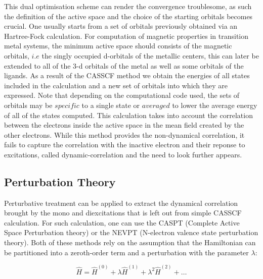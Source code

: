 \documentclass[10pt]{report}
\numberwithin{equation}{section}
\begin{document}
This dual optimisation scheme can render the convergence troublesome, as such the definition of the active space and the choice of the starting orbitals becomes crucial. One usually starts from a set of orbitals previously obtained via an Hartree-Fock calculation.
For computation of magnetic properties in transition metal systems, the minimum active space should consists of the magnetic orbitals, $i.e$ the singly occupied d-orbitals of the metallic centers, this can later be extended to all of the 3-d orbitals of the metal as well as some orbitals of the ligands.
As a result of the CASSCF method we obtain the energies of all states included in the calculation and a new set of orbitals into which they are expressed.
Note that depending on the computational code used, the sets of orbitals may be $specific$ to a single state or $averaged$ to lower the average energy of all of the states computed.
This calculation takes into account the correlation between the electrons inside the active space in the mean field created by the other electrons. 
While this method provides the non-dynamical correlation, it fails to capture the correlation with the inactive electron and their reponse to excitations, called dynamic-correlation and the need to look further appears.


\subsection{Perturbation Theory}

Perturbative treatment can be applied to extract the dynamical correlation brought by the mono and diexcitations that is left out from simple CASSCF calculation. For such calculation, one can use the CASPT (Complete Active Space Perturbation theory)
or the NEVPT (N-electron valence state perturbation theory). Both of these methods rely on the assumption that the Hamiltonian can be partitioned into a zeroth-order term and a perturbation with the parameter $\lambda$:

\begin{equation}
    \hat{H}=\hat{H}^{(0)}+\lambda\hat{H}^{(1)}+\lambda^2 \hat{H}^{(2)}+\ldots
\end{equation}
\end{document}
